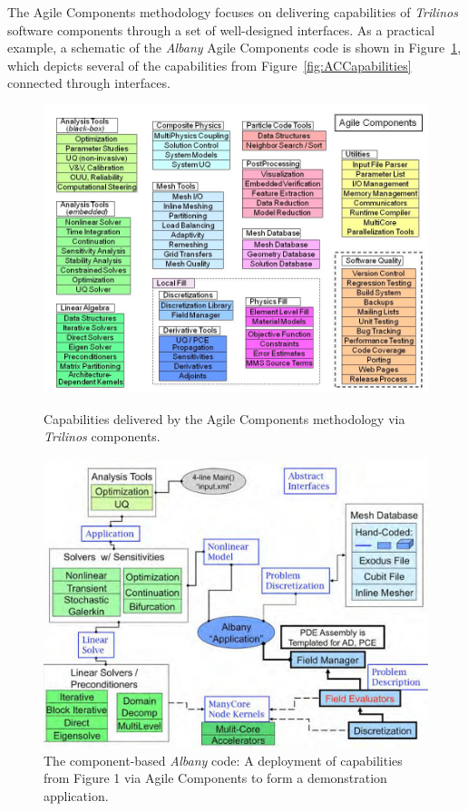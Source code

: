 \documentclass[pdf,ps2pdf,12pt,report]{SANDreport}
\theoremstyle{plain}
\theoremstyle{definition}
\theoremstyle{remark}
\numberwithin{equation}{section}
\begin{document}
The Agile Components methodology focuses on delivering capabilities of \emph{Trilinos} software components through a set of well-designed interfaces. As a practical example, a schematic of the \emph{Albany} Agile Components code is shown in Figure~\ref{fig:ACAlbany}, which depicts several of the capabilities from Figure~\ref{fig:ACCapabilities} connected through interfaces.
\begin{figure}[htbp]
  \begin{center}
  \begin{minipage}[b]{0.8\linewidth}
    \centering
    \includegraphics[width=\linewidth]{AgileComponents1}
    \caption{Capabilities delivered by the Agile Components methodology via \emph{Trilinos} components.}
    \label{fig:ACCapabilities}
  \end{minipage}
  \begin{minipage}[b]{0.8\linewidth}
    \centering
    \includegraphics[width=0.7\linewidth]{AgileComponents2}
    \caption{The component-based \emph{Albany} code: A deployment of capabilities from Figure 1 via Agile Components to form a demonstration application.}
    \label{fig:ACAlbany}
  \end{minipage}
  \end{center}
\end{figure}
\end{document}
